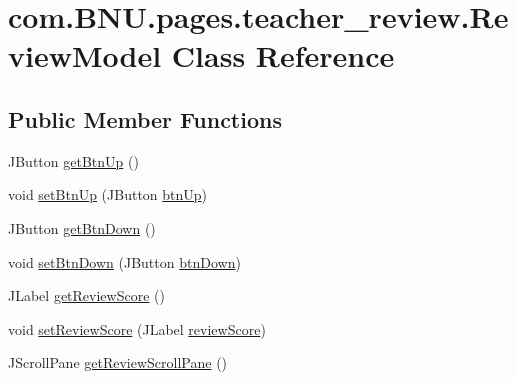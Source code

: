 \hypertarget{classcom_1_1_b_n_u_1_1pages_1_1teacher__review_1_1_review_model}{}\section{com.\+B\+N\+U.\+pages.\+teacher\+\_\+review.\+Review\+Model Class Reference}
\label{classcom_1_1_b_n_u_1_1pages_1_1teacher__review_1_1_review_model}
\subsection*{Public Member Functions}
\begin{DoxyCompactItemize}
\item 
J\+Button \mbox{\hyperlink{classcom_1_1_b_n_u_1_1pages_1_1teacher__review_1_1_review_model_aa0f01b0f7e327cb97dcf5aa5d5799527}{get\+Btn\+Up}} ()
\item 
void \mbox{\hyperlink{classcom_1_1_b_n_u_1_1pages_1_1teacher__review_1_1_review_model_a29c9b9f90aba295f7da7195d6126214e}{set\+Btn\+Up}} (J\+Button \mbox{\hyperlink{classcom_1_1_b_n_u_1_1pages_1_1teacher__review_1_1_review_model_a6550648a32ea3b7c03a528d8606e66f6}{btn\+Up}})
\item 
J\+Button \mbox{\hyperlink{classcom_1_1_b_n_u_1_1pages_1_1teacher__review_1_1_review_model_a074c37e683cf9ed5169593dc14f17d20}{get\+Btn\+Down}} ()
\item 
void \mbox{\hyperlink{classcom_1_1_b_n_u_1_1pages_1_1teacher__review_1_1_review_model_af90859a7a4e723ef72665ca4b8f5c69b}{set\+Btn\+Down}} (J\+Button \mbox{\hyperlink{classcom_1_1_b_n_u_1_1pages_1_1teacher__review_1_1_review_model_acf8e32a693c699a947da47af6c5089fb}{btn\+Down}})
\item 
J\+Label \mbox{\hyperlink{classcom_1_1_b_n_u_1_1pages_1_1teacher__review_1_1_review_model_a7d99d954144a70c8e96a10436114dda8}{get\+Review\+Score}} ()
\item 
void \mbox{\hyperlink{classcom_1_1_b_n_u_1_1pages_1_1teacher__review_1_1_review_model_a9f3dfd95d5fe55d0dbe281eefaa0fb3d}{set\+Review\+Score}} (J\+Label \mbox{\hyperlink{classcom_1_1_b_n_u_1_1pages_1_1teacher__review_1_1_review_model_afdb4ea08dcea2b78d5c9b81a6a5ca677}{review\+Score}})
\item 
J\+Scroll\+Pane \mbox{\hyperlink{classcom_1_1_b_n_u_1_1pages_1_1teacher__review_1_1_review_model_a4e8d1e10e84098a031896977c105d86d}{get\+Review\+Scroll\+Pane}} ()
\item 

\end{DoxyCompactItemize}
